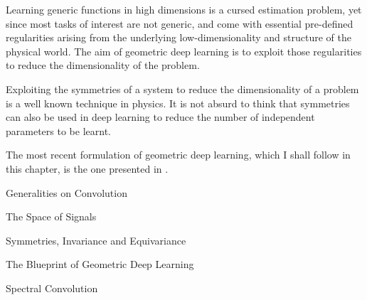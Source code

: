 \documentclass[../main.tex]{subfiles}
\begin{document}
    Learning generic functions in high dimensions is a cursed estimation
    problem, yet since most tasks of interest are not generic, and come with essential
    pre-defined regularities arising from the underlying low-dimensionality
    and structure of the physical world. 
    The aim of geometric deep learning is to exploit those regularities to reduce the dimensionality of the problem.

    Exploiting the symmetries of a system to reduce the dimensionality of a problem is a well known 
    technique in physics. It is not absurd to think that symmetries can also be used in deep learning
    to reduce the number of independent parameters to be learnt.

    The most recent formulation of geometric deep learning, which I shall follow in this chapter, is the one presented in \cite{2021geo}. 

    \begin{section}{Generalities on Convolution}
        \label{sec:3:1}
           
    \end{section}
    \begin{section}{The Space of Signals}
           
    \end{section}
    \begin{section}{Symmetries, Invariance and Equivariance}
         
        \label{sec:3:3}   
    \end{section}
    \begin{section}{The Blueprint of Geometric Deep Learning}
           
    \end{section}
    \begin{section}{Spectral Convolution}
          
    \end{section}
\end{document}

